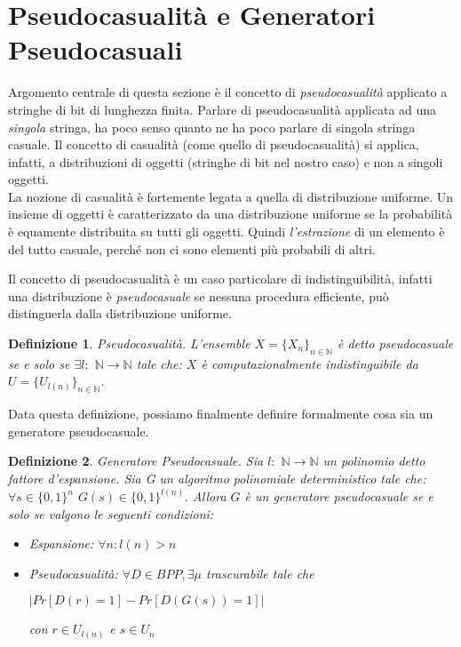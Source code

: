 \documentclass[a4paper,openright,twoside,12pt]{report}
\newtheorem{definizione}{Definizione}[chapter]
\begin{document}
\section{Pseudocasualit\`a e Generatori Pseudocasuali}
Argomento centrale di questa sezione \`e il concetto di \emph{pseudocasualit\`a} applicato a stringhe di bit di lunghezza finita.
Parlare di pseudocasualit\`a applicata ad una \emph{singola} stringa, ha poco senso quanto ne ha poco parlare di singola stringa casuale.
Il concetto di casualit\`a (come quello di pseudocasualit\`a) si applica, infatti, a distribuzioni di oggetti (stringhe di bit nel nostro caso) e non a singoli oggetti.\\
La nozione di casualit\`a \`e fortemente legata a quella di distribuzione uniforme. Un insieme di oggetti \`e caratterizzato
da una distribuzione uniforme se la probabilit\`a \`e equamente distribuita su tutti gli oggetti. Quindi \emph{l'estrazione} di un elemento \`e del tutto casuale, 
perch\'e non ci sono elementi pi\`u probabili di altri.

Il concetto di pseudocasualit\`a \`e un caso particolare di indistinguibilit\`a, infatti una distribuzione \`e \emph{pseudocasuale} se nessuna procedura efficiente, 
pu\`o distinguerla dalla distribuzione uniforme.
\begin{definizione}{Pseudocasualit\`a.}
L'ensemble $X=\{X_n\}_{n \in \mathbb{N}}$ \`e detto pseudocasuale se e solo se $ \exists l:$ $\mathbb{N}\rightarrow\mathbb{N}$ tale che: 
$X$ \`e computazionalmente indistinguibile da $U=\{U_{l(n)}\}_{n \in \mathbb{N}} $.  
\end{definizione}
Data questa definizione, possiamo finalmente definire formalmente cosa sia un generatore pseudocasuale.
\begin{definizione}{Generatore Pseudocasuale.}
Sia $l:$ $\mathbb{N}\rightarrow\mathbb{N}$ un polinomio detto fattore d'espansione. 
Sia G un algoritmo polinomiale deterministico tale che: $\forall s \in \{0, 1\}^{n}$ $G(s) \in \{0, 1\}^{l(n)}.$
Allora $G$ \`e un generatore pseudocasuale se e solo se valgono le seguenti condizioni:
\begin{itemize}
 \item Espansione: $\forall n: l(n) > n$
 \item Pseudocasualit\`a: $\forall D \in BPP, \exists \mu$ trascurabile tale che \begin{center}
                                                   $\lvert Pr[D(r) = 1] - Pr[D(G(s)) = 1]\rvert$                               
                                                                                 \end{center} 
con $r \in U_{l(n)}$ e $s \in U_{n}$
\end{itemize}
\end{definizione}
\end{document}

